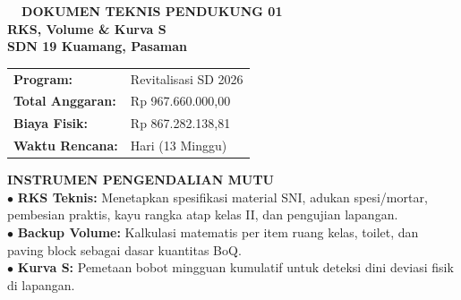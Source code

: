 \documentclass[10pt,a4paper,landscape]{article}
\begin{document}
\noindent
\begin{minipage}[t]{0.30\linewidth}
  \vspace{0pt}
  \begin{tcolorbox}[sharp corners, boxrule=0.8pt, colframe=pborder, colback=white, left=3mm, right=3mm, top=2.5mm, bottom=2.5mm, height=98mm]
    \colorbox{pred}{\fontsize{7pt}{8pt}\selectfont\bfseries\color{white}\ \ DOKUMEN TEKNIS PENDUKUNG 01\ \ }\\[1.5mm]
    {\fontsize{9.5pt}{11.5pt}\selectfont\bfseries\color{pnavy}RKS, Volume \& Kurva S}\\[0.5mm]
    {\fontsize{7pt}{8.5pt}\selectfont\bfseries\color{pred}SDN 19 Kuamang, Pasaman}\\[2mm]

    \begin{tcolorbox}[sharp corners, boxrule=0.5pt, colframe=pborder, colback=pbglight, left=2mm, right=2mm, top=1.5mm, bottom=1.5mm]
      \begin{tabularx}{\linewidth}{@{}p{22mm} X@{}}
        {\fontsize{6.8pt}{8pt}\selectfont\bfseries Program:} & {\fontsize{6.8pt}{8pt}\selectfont Revitalisasi SD 2026} \\[0.8mm]
        {\fontsize{6.8pt}{8pt}\selectfont\bfseries Total Anggaran:} & {\fontsize{6.8pt}{8pt}\selectfont Rp 967.660.000,00} \\[0.8mm]
        {\fontsize{6.8pt}{8pt}\selectfont\bfseries Biaya Fisik:} & {\fontsize{6.8pt}{8pt}\selectfont Rp 867.282.138,81} \\[0.8mm]
        {\fontsize{6.8pt}{8pt}\selectfont\bfseries Waktu Rencana:} & {\fontsize{6.8pt}{8pt}\selectfont 90 Hari (13 Minggu)}
      \end{tabularx}
    \end{tcolorbox}
    \vspace{1.5mm}

    {\fontsize{7.5pt}{9pt}\selectfont\bfseries\color{pnavy}INSTRUMEN PENGENDALIAN MUTU}\\[0.8mm]
    {\fontsize{6.5pt}{8.2pt}\selectfont\color{psteel}
    $\bullet$ \textbf{RKS Teknis:} Menetapkan spesifikasi material SNI, adukan spesi/mortar, pembesian praktis, kayu rangka atap kelas II, dan pengujian lapangan.\\
    $\bullet$ \textbf{Backup Volume:} Kalkulasi matematis per item ruang kelas, toilet, dan paving block sebagai dasar kuantitas BoQ.\\
    $\bullet$ \textbf{Kurva S:} Pemetaan bobot mingguan kumulatif untuk deteksi dini deviasi fisik di lapangan.
    }
  \end{tcolorbox}
  \vspace{2mm}


\end{minipage}
\end{document}
